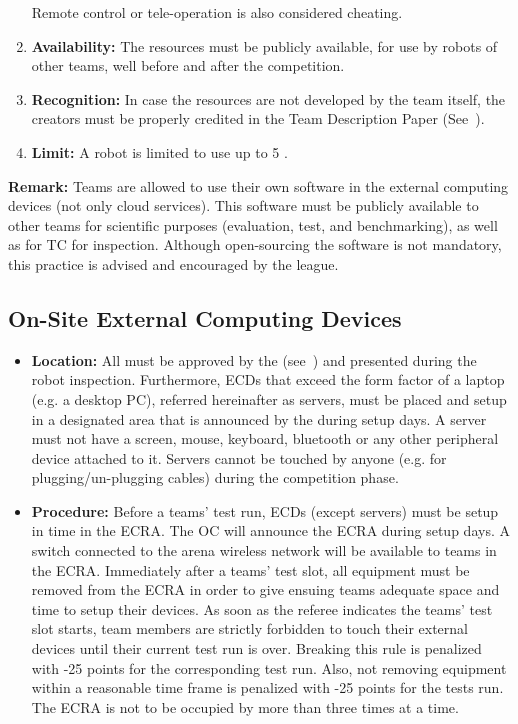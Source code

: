 \begin{enumerate}
	  Remote control or tele-operation is also considered cheating.
	\item \textbf{Availability:} The resources must be publicly available, for use by robots of other teams, well before and after the competition.
	\item \textbf{Recognition:} In case the resources are not developed by the team itself, the creators must be properly credited in the Team Description Paper (See~).
	\item \textbf{Limit:} A robot is limited to use up to 5 .
\end{enumerate}

\textbf{Remark:} Teams are allowed to use their own software in the external computing devices (not only cloud services). This software must be publicly available to other teams for scientific purposes (evaluation, test, and benchmarking), as well as for TC for inspection. Although open-sourcing the software is not mandatory, this practice is advised and encouraged by the league.

\subsection{On-Site External Computing Devices}
\label{rule:robot_external_computing_devices}

\begin{itemize}
  \item \textbf{Location:} All  must be approved by the 
  		(see~) and presented during the robot inspection. Furthermore, ECDs
  		that exceed the form factor of a laptop (e.g. a desktop PC), referred hereinafter as servers, must be placed and
  		setup in a designated area that is announced by the  during setup days.
  		A server must not have a screen, mouse, keyboard, bluetooth or any other peripheral device attached to it.
  		Servers cannot be touched by anyone (e.g. for plugging/un-plugging cables) during the competition phase.
  \item \textbf{Procedure:} Before a teams' test run, ECDs (except servers) must be setup in time in the
		 {ECRA}. The OC will announce the
        ECRA during setup days. A switch connected to the arena wireless network will be available to teams in the ECRA.
  		Immediately after a teams' test slot, all equipment must be removed from the ECRA in order to give ensuing
        teams adequate space and time to setup their devices. As soon as the referee indicates the teams' test slot
        starts, team members are strictly forbidden to touch their external devices until their current test run is over.
        Breaking this  rule is penalized with -25 points for the corresponding test run. Also, not removing
        equipment within a reasonable time frame is penalized with -25 points for the tests run. The ECRA is not to be
		occupied by more than three times at a time.
\end{itemize}


